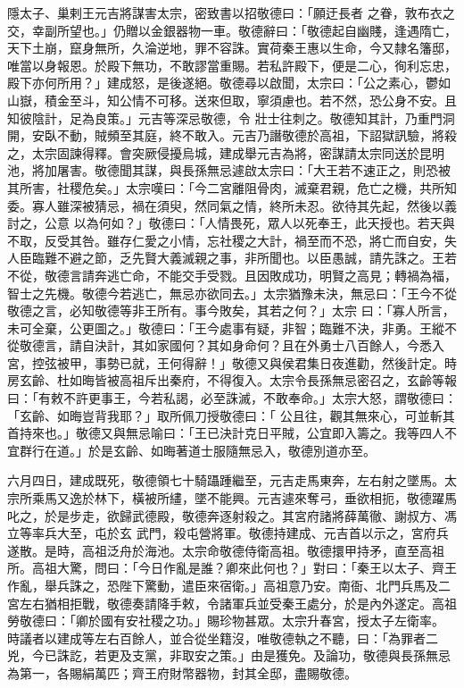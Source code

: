 \begin{pinyinscope}
 隱太子、巢剌王元吉將謀害太宗，密致書以招敬德曰：「願迂長者
 之眷，敦布衣之交，幸副所望也。」仍贈以金銀器物一車。敬德辭曰：「敬德起自幽賤，逢遇隋亡，天下土崩，竄身無所，久淪逆地，罪不容誅。實荷秦王惠以生命，今又隸名籓邸，唯當以身報恩。於殿下無功，不敢謬當重賜。若私許殿下，便是二心，徇利忘忠，殿下亦何所用？」建成怒，是後遂絕。敬德尋以啟聞，太宗曰：「公之素心，鬱如山嶽，積金至斗，知公情不可移。送來但取，寧須慮也。若不然，恐公身不安。且知彼陰計，足為良策。」元吉等深忌敬德，令
 壯士往刺之。敬德知其計，乃重門洞開，安臥不動，賊頻至其庭，終不敢入。元吉乃譖敬德於高祖，下詔獄訊驗，將殺之，太宗固諫得釋。會突厥侵擾烏城，建成舉元吉為將，密謀請太宗同送於昆明池，將加屠害。敬德聞其謀，與長孫無忌遽啟太宗曰：「大王若不速正之，則恐被其所害，社稷危矣。」太宗嘆曰：「今二宮離阻骨肉，滅棄君親，危亡之機，共所知委。寡人雖深被猜忌，禍在須臾，然同氣之情，終所未忍。欲待其先起，然後以義討之，公意
 以為何如？」敬德曰：「人情畏死，眾人以死奉王，此天授也。若天與不取，反受其咎。雖存仁愛之小情，忘社稷之大計，禍至而不恐，將亡而自安，失人臣臨難不避之節，乏先賢大義滅親之事，非所聞也。以臣愚誠，請先誅之。王若不從，敬德言請奔逃亡命，不能交手受戮。且因敗成功，明賢之高見；轉禍為福，智士之先機。敬德今若逃亡，無忌亦欲同去。」太宗猶豫未決，無忌曰：「王今不從敬德之言，必知敬德等非王所有。事今敗矣，其若之何？」太宗
 曰：「寡人所言，未可全棄，公更圖之。」敬德曰：「王今處事有疑，非智；臨難不決，非勇。王縱不從敬德言，請自決計，其如家國何？其如身命何？且在外勇士八百餘人，今悉入宮，控弦被甲，事勢已就，王何得辭！」敬德又與侯君集日夜進勸，然後計定。時房玄齡、杜如晦皆被高祖斥出秦府，不得復入。太宗令長孫無忌密召之，玄齡等報曰：「有敕不許更事王，今若私謁，必至誅滅，不敢奉命。」太宗大怒，謂敬德曰：「玄齡、如晦豈背我耶？」取所佩刀授敬德曰：「
 公且往，觀其無來心，可並斬其首持來也。」敬德又與無忌喻曰：「王已決計克日平賊，公宜即入籌之。我等四人不宜群行在道。」於是玄齡、如晦著道士服隨無忌入，敬德別道亦至。



 六月四日，建成既死，敬德領七十騎躡踵繼至，元吉走馬東奔，左右射之墜馬。太宗所乘馬又逸於林下，橫被所繣，墜不能興。元吉遽來奪弓，垂欲相扼，敬德躍馬叱之，於是步走，欲歸武德殿，敬德奔逐射殺之。其宮府諸將薛萬徹、謝叔方、馮立等率兵大至，屯於玄
 武門，殺屯營將軍。敬德持建成、元吉首以示之，宮府兵遂散。是時，高祖泛舟於海池。太宗命敬德侍衛高祖。敬德擐甲持矛，直至高祖所。高祖大驚，問曰：「今日作亂是誰？卿來此何也？」對曰：「秦王以太子、齊王作亂，舉兵誅之，恐陛下驚動，遣臣來宿衛。」高祖意乃安。南衙、北門兵馬及二宮左右猶相拒戰，敬德奏請降手敕，令諸軍兵並受秦王處分，於是內外遂定。高祖勞敬德曰：「卿於國有安社稷之功。」賜珍物甚眾。太宗升春宮，授太子左衛率。
 時議者以建成等左右百餘人，並合從坐籍沒，唯敬德執之不聽，曰：「為罪者二兇，今已誅訖，若更及支黨，非取安之策。」由是獲免。及論功，敬德與長孫無忌為第一，各賜絹萬匹；齊王府財幣器物，封其全邸，盡賜敬德。




\end{pinyinscope}
